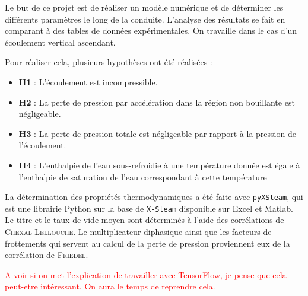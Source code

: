 Le but de ce projet est de réaliser un modèle numérique et de déterminer les différents paramètres le long de la conduite. L'analyse des résultats se fait en comparant à des tables de données expérimentales. On travaille dans le cas d'un écoulement vertical ascendant.\\ \par
Pour réaliser cela, plusieurs hypothèses ont été réalisées :
\begin{itemize}
    \item \textbf{H1} : L'écoulement est incompressible.
    \item \textbf{H2} : La perte de pression par accélération dans la région non bouillante est négligeable.
    \item \textbf{H3} : La perte de pression totale est négligeable par rapport à la pression de l'écoulement.
    \item \textbf{H4} : L'enthalpie de l'eau sous-refroidie à une température donnée est égale à l'enthalpie de saturation de l'eau correspondant à cette température
\end{itemize}
\vspace{12pt}
\par
La détermination des propriétés thermodynamiques a été faite avec \texttt{pyXSteam}, qui est une librairie Python sur la base de \texttt{X-Steam} disponible sur Excel et Matlab.\\
Le titre et le taux de vide moyen sont déterminés à l'aide des corrélations de \textsc{Chexal-Lellouche}. Le multiplicateur diphasique ainsi que les facteurs de frottements qui servent au calcul de la perte de pression proviennent eux de la corrélation de \textsc{Friedel}.\\ \par
\textcolor{red}{A voir si on met l'explication de travailler avec TensorFlow, je pense que cela peut-etre intéressant. On aura le temps de reprendre cela.}




